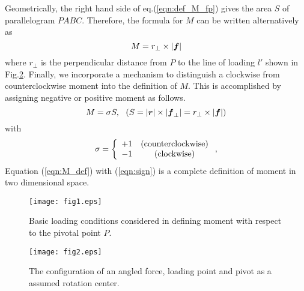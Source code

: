 \documentclass[10pt,a4j]{article}
\begin{document}
Geometrically, the right hand side of eq.(\ref{eqn:def_M_fp}) gives the area $S$ of 
parallelogram $PABC$. Therefore, the formula for $M$ can be written alternatively as
\begin{equation}
	M=r_\perp \times |\mbox{\boldmath $f$}|
	\label{eqn:}
\end{equation}
where $r_\perp$ is the perpendicular distance from $P$ to the line of loading 
$l'$ shown in Fig.\ref{fig:fig2}.
Finally, we incorporate a mechanism to distinguish a clockwise from counterclockwise 
moment into the definition of $M$. This is accomplished by assigning negative or  
positive moment as follows.
\begin{equation}
	M=\sigma S , \ \ \left(S= |\mbox{\boldmath $r$}|\times |\mbox{\boldmath $f$}_{\perp}|=r_\perp \times |\mbox{\boldmath $f$}| \right)
	\label{eqn:M_def}
\end{equation}
with 
\begin{equation}
	\sigma=\left\{
		\begin{array}{cc}
			+1 & ({\rm counterclockwise}) \\
			-1 & ({\rm clockwise}) 
		\end{array}
	\right.
	,
	\label{eqn:sign}
\end{equation}
Equation (\ref{eqn:M_def}) with (\ref{eqn:sign}) is a complete definition of moment in two dimensional space. 
\begin{figure}[h]
	\begin{center}
	\texttt{[image: fig1.eps]} 
	\end{center}
	\caption{
		Basic loading conditions considered in defining moment with 
		respect to the pivotal point $P$.} 
	\label{fig:fig1}
\end{figure}
\begin{figure}[h]
	\begin{center}
	\texttt{[image: fig2.eps]} 
	\end{center}
	\caption{The configuration of an angled force, loading point and pivot as a assumed rotation center.} 
	\label{fig:fig2}
\end{figure}
\end{document}
